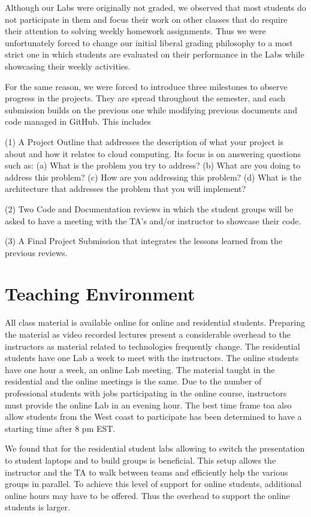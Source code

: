 \documentclass[conference]{IEEEtran}
\begin{document}
Although our Labs were originally not graded, we observed that most students do not participate in them and focus their work on other classes that do require their attention to solving weekly homework assignments. Thus we were unfortunately forced to change our initial liberal grading philosophy to a most strict one in which students are evaluated on their performance in the Labs while showcasing their weekly activities.

For the same reason, we were forced to introduce three milestones to observe progress in the projects. They are spread throughout the semester, and each submission builds on the previous one while modifying previous documents and code managed in GitHub. This includes

(1) A Project Outline that addresses the description of what your project is about and how it relates to cloud computing. Its focus is on answering questions such as: (a) What is the problem you try to address?  (b) What are you doing to address this problem?  (c) How are you addressing this problem?  (d) What is the architecture that addresses the problem that you will implement?

(2) Two Code and Documentation reviews in which the student groups will be asked to have a meeting with the TA's and/or instructor to showcase their code.


(3) A Final Project Submission that integrates the lessons learned from the previous reviews.


\section{Teaching Environment}

All class material is available online for online and residential students. Preparing the material as video recorded lectures present a considerable overhead to the instructors as material related to technologies frequently change. The residential students have one Lab a week to meet with the instructors. The online students have one hour a week, an online Lab meeting. The material taught in the residential and the online meetings is the same. Due to the number of professional students with jobs participating in the online course, instructors must provide the online Lab in an evening hour. The best time frame toa also allow students from the West coast to participate has been determined to have a starting time after 8 pm EST.

We found that for the residential student labs allowing to switch the presentation to student laptops and to build groups is beneficial. This setup allows the instructor and the TA to walk between teams and efficiently help the various groups in parallel. To achieve this level of support for online students, additional online hours may have to be offered. Thus the overhead to support the online students is larger.
\end{document}
